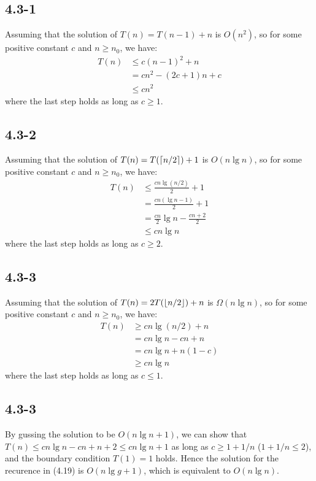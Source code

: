 \subsection{4.3-1}
    Assuming that the solution of $T(n) = T(n-1) + n$ is $O(n^2)$, so for some
    positive constant $c$ and $n \ge n_0$, we have:
    \begin{align*}
        T(n) & \le c(n - 1)^2 + n \\
             & = cn^2 - (2c + 1 )n + c \\
             & \le cn^2
    \end{align*}
    where the last step holds as long as $c \ge 1$.
\subsection{4.3-2}
    Assuming that the solution of $T(n) = T(\lceil n/2\rceil) + 1$ is $O(n\lg n)$,
    so for some positive constant $c$ and $n \ge n_0$, we have:
    \begin{align*}
        T(n) & \le \frac{cn\lg(n/2)}{2} + 1 \\
             & = \frac{cn(\lg n - 1)}{2} + 1 \\
             & = \frac{cn}{2}\lg n - \frac{cn+2}{2} \\
             & \le cn\lg n
    \end{align*}
    where the last step holds as long as $c \ge 2$.
\subsection{4.3-3}
    Assuming that the solution of $T(n) = 2T(\lfloor n/2\rfloor) + n$ is
    $\Omega(n\lg n)$, so for some positive constant $c$ and $n \ge n_0$, we have:
    \begin{align*}
        T(n) & \ge cn\lg(n/2) + n \\
             & = cn\lg n - cn + n \\
             & = cn\lg n + n(1-c) \\
             & \ge cn\lg n
    \end{align*}
    where the last step holds as long as $c \le 1$.
\subsection{4.3-3}
    By gussing the solution to be $O(n\lg n + 1)$, we can show that $T(n) \le
    cn\lg n - cn + n + 2 \le cn\lg n + 1$ as long as $c \ge 1 + 1/n$
    ($1 + 1/n \le 2$), and the boundary condition $T(1) = 1$ holds. Hence
    the solution for the recurence in (4.19) is $O(n\lg g + 1)$, which is
    equivalent to $O(n\lg n)$.
